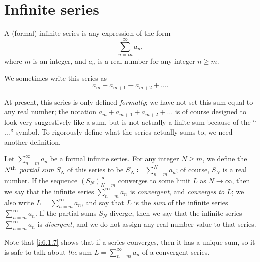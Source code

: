 \section{Infinite series}\label{i:sec:7.2}

\begin{defn}\label{i:7.2.1}
  A (formal) infinite series is any expression of the form
  \[
    \sum_{n = m}^\infty a_n,
  \]
  where \(m\) is an integer, and \(a_n\) is a real number for any integer \(n \geq m\).
\end{defn}

\begin{note}
  We sometimes write this series as
  \[
    a_m + a_{m + 1} + a_{m + 2} + \dots.
  \]
\end{note}

\begin{note}
  At present, this series is only defined \emph{formally};
  we have not set this sum equal to any real number;
  the notation \(a_m + a_{m + 1} + a_{m + 2} + \dots\) is of course designed to look very suggestively like a sum, but is not actually a finite sum because of the ``\(\dots\)'' symbol.
  To rigorously define what the series actually sums to, we need another definition.
\end{note}

\begin{defn}\label{i:7.2.2}
  Let \(\sum_{n = m}^\infty a_n\) be a formal infinite series.
  For any integer \(N \geq m\), we define the \emph{\(N^{\operatorname{th}}\) partial sum} \(S_N\) of this series to be \(S_N \coloneqq \sum_{n = m}^N a_n\);
  of course, \(S_N\) is a real number.
  If the sequence \((S_N)_{N = m}^\infty\) converges to some limit \(L\) as \(N \to \infty\), then we say that the infinite series \(\sum_{n = m}^\infty a_n\) is \emph{convergent}, and \emph{converges to \(L\)};
  we also write \(L = \sum_{n = m}^\infty a_n\), and say that \(L\) is the \emph{sum} of the infinite series \(\sum_{n = m}^\infty a_n\).
  If the partial sums \(S_N\) diverge, then we say that the infinite series \(\sum_{n = m}^\infty a_n\) is \emph{divergent}, and we do not assign any real number value to that series.
\end{defn}

\begin{rmk}\label{i:7.2.3}
  Note that \cref{i:6.1.7} shows that if a series converges, then it has a unique sum, so it is safe to talk about \emph{the} sum \(L = \sum_{n = m}^\infty a_n\) of a convergent series.
\end{rmk}

